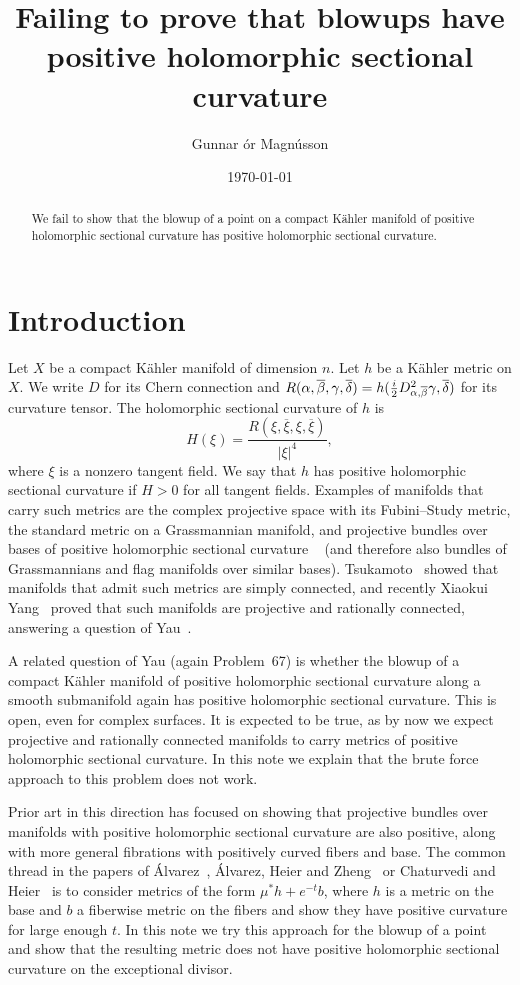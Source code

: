\documentclass[10pt,a4paper]{amsart}
\author{Gunnar \TH\'or Magn\'usson}
\date{\today}
\title[Failing at blowups]
{Failing to prove that blowups have\\positive holomorphic sectional curvature}
\def\ov#1{\overline{#1}}
\def\hsc{holomorphic sectional curvature}
\begin{document}
\begin{abstract}
We fail to show that the blowup of a point on a compact K\"ahler manifold of
positive holomorphic sectional curvature has positive holomorphic sectional
curvature.
\end{abstract}

\maketitle


\section*{Introduction}

Let $X$ be a compact K\"ahler manifold of dimension $n$.
Let $h$ be a K\"ahler metric on $X$.
We write $D$ for its Chern connection and
$R(\alpha,\ov\beta,\gamma,\ov\delta) = h(\frac i2
D^2_{\smash{\alpha,\ov\beta}}\gamma, \ov\delta)$ for its curvature tensor. The
holomorphic sectional curvature of $h$ is
$$
H(\xi)
= \frac{R(\xi, \ov\xi, \xi, \ov\xi)}{|\xi|^4},
$$
where $\xi$ is a nonzero tangent field.
We say that $h$ has positive holomorphic sectional curvature if $H > 0$ for all
tangent fields.
Examples of manifolds that carry such metrics are the complex projective space
with its Fubini--Study metric, the standard metric on a Grassmannian manifold,
and projective bundles over bases of positive holomorphic sectional curvature
~\cite{alvarez2018projectivized}
(and therefore also bundles of Grassmannians and flag manifolds over similar
bases).
Tsukamoto~\cite{tsukamoto1957kahlerian} showed that manifolds that admit such
metrics are simply connected, and recently Xiaokui Yang~\cite{yang2017rc}
proved that such manifolds are projective and rationally connected, answering a
question of Yau~\cite[Problem~67]{yau1993open}.

A related question of Yau (again Problem~67) is whether the blowup of a compact
K\"ahler manifold of positive \hsc{} along a smooth submanifold again has
positive \hsc.
This is open, even for complex surfaces.
It is expected to be true, as by now we expect projective and rationally
connected manifolds to carry metrics of positive \hsc{}. In this note we
explain that the brute force approach to this problem does not work.

Prior art in this direction has focused on showing that projective bundles
over manifolds with positive \hsc{} are also positive, along with more
general fibrations with positively curved fibers and base.
The common thread in the papers of
\'Alvarez~\cite{alvarez2016positive},
\'Alvarez,
Heier and Zheng~\cite{alvarez2018projectivized} or Chaturvedi and
Heier~\cite{chaturvedi2020hermitian}
is to consider metrics of the form $\mu^* h + e^{-t} b$, where $h$ is a metric
on the base and $b$ a fiberwise metric on the fibers and show they have
positive curvature for large enough $t$.
In this note we try this approach for the blowup of a point and show that
the resulting metric does not have positive \hsc{} on the exceptional divisor.
\end{document}
